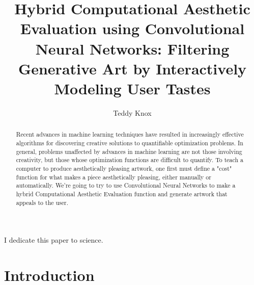 \documentclass[midd]{thesis}
\title {Hybrid Computational Aesthetic Evaluation using Convolutional Neural Networks: Filtering Generative Art by Interactively Modeling User Tastes}
\author {Teddy Knox}
\begin{document}
\maketitle

\begin{abstract}
Recent advances in machine learning techniques have resulted in increasingly effective algorithms for discovering creative
solutions to quantifiable optimization problems. In general, problems unaffected by advances in machine learning are not
those involving creativity, but those whose optimization functions are difficult to quantify. To teach a computer to
produce aesthetically pleasing artwork, one first must define a "cost" function for what makes a piece aesthetically
pleasing, either manually or automatically. We're going to try to use Convolutional Neural Networks to make a hybrid
Computational Aesthetic Evaluation function and generate artwork that appeals to the user.
\end{abstract}

\begin{acknowledgements}
I dedicate this paper to science.
\end{acknowledgements}

\contentspage
\tablelistpage
\figurelistpage

\normalspacing \setcounter{page}{1} 

\chapter{Introduction}
\label{sec:intro}
\end{document}
